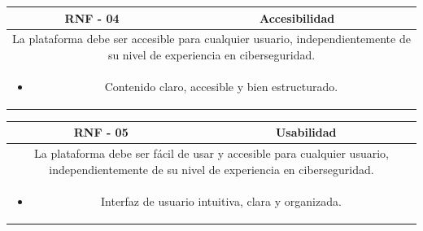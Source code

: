             \begin{table}[!htbp]
                \centering

                \begin{tabular}{|c|c|}
                    \hline
                    \textbf{RNF - 04} & \textbf{Accesibilidad} \\
                    \hline
                    \multicolumn{2}{|p{15cm}|}{
                        La plataforma debe ser accesible para cualquier usuario, independientemente de su nivel de experiencia en ciberseguridad.
                    } \\
                    \hline
                    \multicolumn{2}{|p{15cm}|}{
                        \begin{itemize}
                            \item Contenido claro, accesible y bien estructurado.
                        \end{itemize}
                        } \\
                    \hline
                \end{tabular}

                \label{tab:RNF4}
            \end{table}
            
            \begin{table}[!htbp]
                \centering

                \begin{tabular}{|c|c|}
                    \hline
                    \textbf{RNF - 05} & \textbf{Usabilidad} \\
                    \hline
                    \multicolumn{2}{|p{15cm}|}{
                        La plataforma debe ser fácil de usar y accesible para cualquier usuario, independientemente de su nivel de experiencia en ciberseguridad.
                    } \\
                    \hline
                    \multicolumn{2}{|p{15cm}|}{
                        \begin{itemize}
                            \item Interfaz de usuario intuitiva, clara y organizada.
                        \end{itemize}
                        } \\
                    \hline
                \end{tabular}

                \label{tab:RNF5}
            \end{table}
            
